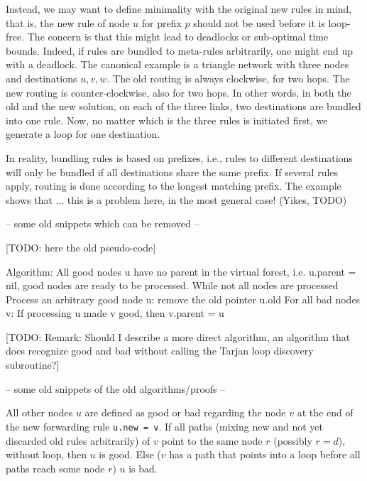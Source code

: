 Instead, we may want to define minimality with the original new rules in mind, that is, the new rule of node $u$ for prefix $p$ should not be used before it is loop-free. The concern is that this might lead to deadlocks or sub-optimal time bounds. Indeed, if rules are bundled to meta-rules arbitrarily, one might end up with a deadlock. The canonical example is a triangle network with three nodes and destinations $u,v,w$. The old routing is always clockwise, for two hops. The new routing is counter-clockwise, also for two hops. In other words, in both the old and the new solution, on each of the three links, two destinations are bundled into one rule. Now, no matter which is the three rules is initiated first, we generate a loop for one destination.

In reality, bundling rules is based on prefixes, i.e., rules to different destinations will only be bundled if all destinations share the same prefix. If several rules apply, routing is done according to the longest matching prefix. The example shows that ... this is a problem here, in the most general case! (Yikes, TODO)




-- some old snippets which can be removed --

[TODO: here the old pseudo-code]

Algorithm:
All good nodes u have no parent in the virtual forest, i.e. u.parent = nil, good nodes are ready to be processed.
While not all nodes are processed
	Process an arbitrary good node u: remove the old pointer u.old
	For all bad nodes v:
		If processing u made v good, then v.parent = u

[TODO: Remark: Should I describe a more direct algorithm, an algorithm that does recognize good and bad without calling the Tarjan loop discovery subroutine?]

-- some old snippets of the old algorithms/proofs --

All other nodes $u$ are defined as good or bad regarding the node $v$ at the end of the new forwarding rule \texttt{u.new = v}. If all paths (mixing new and not yet discarded old rules arbitrarily) of $v$ point to the same node $r$ (possibly $r = d$), without loop, then $u$ is good. Else ($v$ has a path that points into a loop before all paths reach some node $r$) $u$ is bad.


